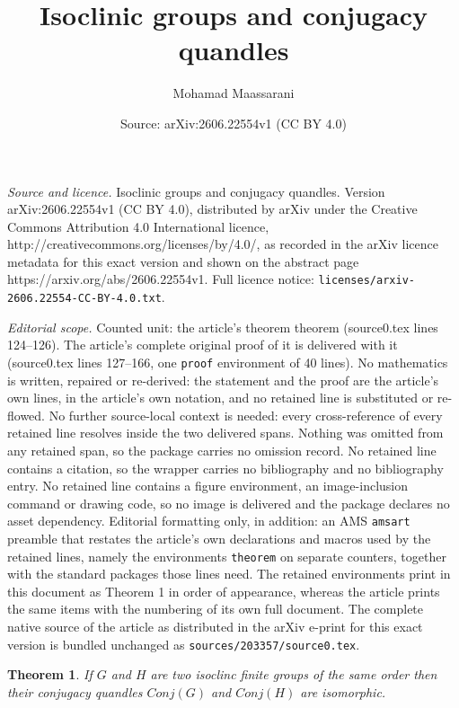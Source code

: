\documentclass[10pt,a4paper]{amsart}
\title{Isoclinic groups and conjugacy quandles}
\author{Mohamad Maassarani}
\date{Source: arXiv:2606.22554v1 (CC BY 4.0)}
\newtheorem{theorem}{Theorem}
\begin{document}
\maketitle

\noindent\emph{Source and licence.} Isoclinic groups and conjugacy quandles. Version arXiv:2606.22554v1 (CC BY 4.0), distributed by arXiv under the Creative Commons Attribution 4.0 International licence, http://creativecommons.org/licenses/by/4.0/, as recorded in the arXiv licence metadata for this exact version and shown on the abstract page https://arxiv.org/abs/2606.22554v1. Full licence notice: \texttt{licenses/arxiv-2606.22554-CC-BY-4.0.txt}.\par\smallskip

\noindent\textit{Editorial scope.} Counted unit: the article's theorem theorem (source0.tex lines 124--126). The article's complete original proof of it is delivered with it (source0.tex lines 127--166, one \texttt{proof} environment of 40 lines). No mathematics is written, repaired or re-derived: the statement and the proof are the article's own lines, in the article's own notation, and no retained line is substituted or re-flowed.  No further source-local context is needed: every cross-reference of every retained line resolves inside the two delivered spans.  Nothing was omitted from any retained span, so the package carries no omission record.  No retained line contains a citation, so the wrapper carries no bibliography and no bibliography entry.  No retained line contains a figure environment, an image-inclusion command or drawing code, so no image is delivered and the package declares no asset dependency.  Editorial formatting only, in addition: an AMS \texttt{amsart} preamble that restates the article's own declarations and macros used by the retained lines, namely the environments \texttt{theorem} on separate counters, together with the standard packages those lines need.  The retained environments print in this document as Theorem 1 in order of appearance, whereas the article prints the same items with the numbering of its own full document.  The complete native source of the article as distributed in the arXiv e-print for this exact version is bundled unchanged as \texttt{sources/203357/source0.tex}.
\begin{theorem}
If $G$ and $H$ are two isoclinc finite groups of the same order then their conjugacy quandles $Conj(G)$ and $Conj(H)$ are isomorphic.
\end{theorem}
\end{document}
